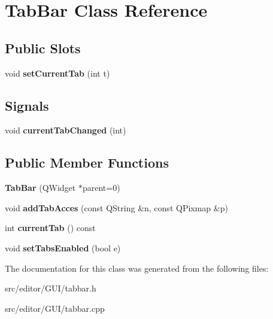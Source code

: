 \hypertarget{class_tab_bar}{\section{\-Tab\-Bar \-Class \-Reference}
\label{class_tab_bar}
}
\subsection*{\-Public \-Slots}
\begin{DoxyCompactItemize}
\item 
\hypertarget{class_tab_bar_a71b20e36e9d73a3ab7de30af404b4f67}{void {\bfseries set\-Current\-Tab} (int t)}\label{class_tab_bar_a71b20e36e9d73a3ab7de30af404b4f67}

\end{DoxyCompactItemize}
\subsection*{\-Signals}
\begin{DoxyCompactItemize}
\item 
\hypertarget{class_tab_bar_af1823815958705f27ab8e7a90262c27e}{void {\bfseries current\-Tab\-Changed} (int)}\label{class_tab_bar_af1823815958705f27ab8e7a90262c27e}

\end{DoxyCompactItemize}
\subsection*{\-Public \-Member \-Functions}
\begin{DoxyCompactItemize}
\item 
\hypertarget{class_tab_bar_ad91da41e8bfec9cf184f36b49ba4bf6b}{{\bfseries \-Tab\-Bar} (\-Q\-Widget $\ast$parent=0)}\label{class_tab_bar_ad91da41e8bfec9cf184f36b49ba4bf6b}

\item 
\hypertarget{class_tab_bar_a5d781313049c908d0276bae3111cda5c}{void {\bfseries add\-Tab\-Acces} (const \-Q\-String \&n, const \-Q\-Pixmap \&p)}\label{class_tab_bar_a5d781313049c908d0276bae3111cda5c}

\item 
\hypertarget{class_tab_bar_a78cf61eaaaf5ceed7de52bc3ff1ca07c}{int {\bfseries current\-Tab} () const }\label{class_tab_bar_a78cf61eaaaf5ceed7de52bc3ff1ca07c}

\item 
\hypertarget{class_tab_bar_a6bb891b77ab937e8d97022cf7d46cf3a}{void {\bfseries set\-Tabs\-Enabled} (bool e)}\label{class_tab_bar_a6bb891b77ab937e8d97022cf7d46cf3a}

\end{DoxyCompactItemize}


\-The documentation for this class was generated from the following files\-:\begin{DoxyCompactItemize}
\item 
src/editor/\-G\-U\-I/tabbar.\-h\item 
src/editor/\-G\-U\-I/tabbar.\-cpp\end{DoxyCompactItemize}
